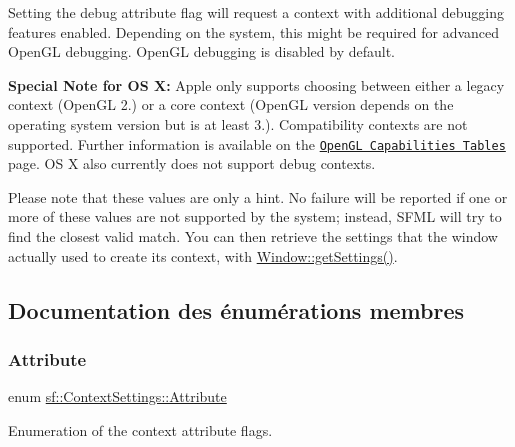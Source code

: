 Setting the debug attribute flag will request a context with additional debugging features enabled. Depending on the system, this might be required for advanced Open\+GL debugging. Open\+GL debugging is disabled by default.

{\bfseries Special Note for OS X\+:} Apple only supports choosing between either a legacy context (Open\+GL 2.) or a core context (Open\+GL version depends on the operating system version but is at least 3.). Compatibility contexts are not supported. Further information is available on the \href{https://developer.apple.com/opengl/capabilities/index.html}{\tt Open\+GL Capabilities Tables} page. OS X also currently does not support debug contexts.

Please note that these values are only a hint. No failure will be reported if one or more of these values are not supported by the system; instead, S\+F\+ML will try to find the closest valid match. You can then retrieve the settings that the window actually used to create its context, with \hyperlink{classsf_1_1Window_ae5b8065e92bbd0408e1fd8328e80d7d1}{Window\+::get\+Settings()}. 

\subsection{Documentation des énumérations membres}
\mbox{\label{structsf_1_1ContextSettings_af2e91e57e8d26c40afe2ec8efaa32a2c}} 
\subsubsection{\texorpdfstring{Attribute}{Attribute}}
{\footnotesize\ttfamily enum \hyperlink{structsf_1_1ContextSettings_af2e91e57e8d26c40afe2ec8efaa32a2c}{sf\+::\+Context\+Settings\+::\+Attribute}}



Enumeration of the context attribute flags. 

